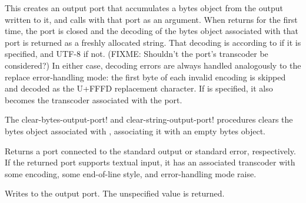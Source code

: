 \begin{entry}{%
}
   
 This
creates an output port that accumulates a bytes object from the output
written to it, and calls  with that port as an argument.
When  returns for the first time, the port is closed and the
decoding of the bytes object associated with that port is returned as
a freshly allocated string.  That decoding is according to
 if it is specified, and UTF-8 if not.
(FIXME: Shouldn't the port's transcoder be considered?)
In either
case, decoding errors are always handled analogously to the {\cf
  replace} error-handling mode: the first byte of each invalid
encoding is skipped and decoded as the U+FFFD replacement character.
If  is specified, it also becomes the transcoder
associated with the port.
\end{entry}

\begin{entry}{%
}

The {\cf clear-bytes-output-port!} and {\cf clear-string-output-port!}
procedures clears the bytes object associated with ,
associating it with an empty bytes object.
\end{entry}

\begin{entry}{%
}
   
Returns a port connected to the standard output or standard error,
respectively. If the returned port supports textual input, it has an
associated transcoder with some encoding, some end-of-line style, and
error-handling mode {\cf raise}.
\end{entry}

\begin{entry}{%
}

Writes  to the output port. The unspecified value is returned.
\end{entry}

